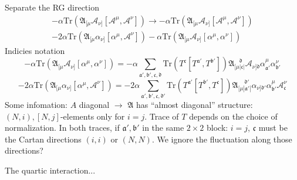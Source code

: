 Separate the RG direction
\begin{align*}
	- \alpha \mathrm{Tr} \left( 
	\mathfrak{A}_{[\mu} \mathcal{A}_{\nu]}
	[\mathcal{A}^\mu,\mathcal{A}^\nu]\right) 
	\to 
	- \alpha \mathrm{Tr} \left( 
	\mathfrak{A}_{[\mu} \mathcal{A}_{\nu]}
	[\mathcal{A}^\mu,\mathcal{A}^\nu]\right)  \\
	- 2 \alpha \mathrm{Tr} \left( 
	\mathfrak{A}_{[\mu} \alpha_{\nu]}
	[\alpha^\mu,\mathcal{A}^\nu]\right) 
	- \alpha \mathrm{Tr} \left( 
	\mathfrak{A}_{[\mu} \mathcal{A}_{\nu]}
	[\alpha^\mu,\alpha^\nu]\right) 
\end{align*}
Indicies notation
\begin{equation*}
	- \alpha \mathrm{Tr} \left( 
	\mathfrak{A}_{[\mu} \mathcal{A}_{\nu]}
	[\alpha^\mu,\alpha^\nu]\right) 
	=-\alpha \sum_{\mathfrak{a}',\mathfrak{b}',\mathfrak{c},\mathfrak{d}}
	\mathrm{Tr}(T^{\mathfrak{c}}[T^{\mathfrak{a}'},T^{\mathfrak{b}'}])
	\mathfrak{A}_{[\mu|\mathfrak{c}|}^{~~~~\mathfrak{d}}
	\mathcal{A}_{\nu]\mathfrak{d}}
	\alpha^\mu_{\mathfrak{a}'} \alpha^\nu_{\mathfrak{b}'}
\end{equation*}
\begin{equation*}
	- 2 \alpha \mathrm{Tr} \left( 
	\mathfrak{A}_{[\mu} \alpha_{\nu]}
	[\alpha^\mu,\mathcal{A}^\nu]\right) 
	= -2 \alpha \sum_{\mathfrak{a}',\mathfrak{b}',\mathfrak{c},\mathfrak{d}'}
	\mathrm{Tr}(T^{\mathfrak{a}'} [T^{\mathfrak{b}'},T^{\mathfrak{c}}])
	\mathfrak{A}_{[\mu|\mathfrak{a}'|}^{~~~~~\mathfrak{d}'}
	\alpha_{\nu]\mathfrak{d}'}
	\alpha^\mu_{\mathfrak{b}'}
	\mathcal{A}^\nu_{\mathfrak{c}}
\end{equation*}
Some infomation: $A$ diagonal $\to$ $\mathfrak{A}$ has ``almost diagonal''
structure: $(N,i),[N,j]$-elements only for $i=j$.
Trace of $T$ depends on the choice of normalization.
In both traces, if $\mathfrak{a}',\mathfrak{b}'$ in the same $2\times 2$ block:
$i=j$,
$\mathfrak{c}$ must be the Cartan directions $(i,i)$ or $(N,N)$.
We ignore the fluctuation along those directions?

The quartic interaction...
